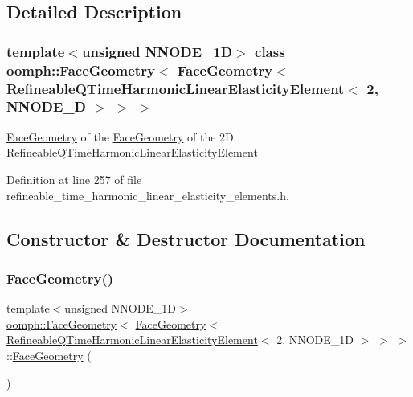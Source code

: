 \subsection{Detailed Description}
\subsubsection*{template$<$unsigned N\+N\+O\+D\+E\+\_\+1D$>$\newline
class oomph\+::\+Face\+Geometry$<$ Face\+Geometry$<$ Refineable\+Q\+Time\+Harmonic\+Linear\+Elasticity\+Element$<$ 2, N\+N\+O\+D\+E\+\_\+D $>$ $>$ $>$}

\hyperlink{classoomph_1_1FaceGeometry}{Face\+Geometry} of the \hyperlink{classoomph_1_1FaceGeometry}{Face\+Geometry} of the 2D \hyperlink{classoomph_1_1RefineableQTimeHarmonicLinearElasticityElement}{Refineable\+Q\+Time\+Harmonic\+Linear\+Elasticity\+Element} 

Definition at line 257 of file refineable\+\_\+time\+\_\+harmonic\+\_\+linear\+\_\+elasticity\+\_\+elements.\+h.



\subsection{Constructor \& Destructor Documentation}
\mbox{\label{classoomph_1_1FaceGeometry_3_01FaceGeometry_3_01RefineableQTimeHarmonicLinearElasticityElement_30dd001f9853903c36c2fd45bbf5d07b1_a7fe13602752eb37aacf55c21912186cc}} 
\subsubsection{\texorpdfstring{Face\+Geometry()}{FaceGeometry()}}
{\footnotesize\ttfamily template$<$unsigned N\+N\+O\+D\+E\+\_\+1D$>$ \\
\hyperlink{classoomph_1_1FaceGeometry}{oomph\+::\+Face\+Geometry}$<$ \hyperlink{classoomph_1_1FaceGeometry}{Face\+Geometry}$<$ \hyperlink{classoomph_1_1RefineableQTimeHarmonicLinearElasticityElement}{Refineable\+Q\+Time\+Harmonic\+Linear\+Elasticity\+Element}$<$ 2, N\+N\+O\+D\+E\+\_\+1D $>$ $>$ $>$\+::\hyperlink{classoomph_1_1FaceGeometry}{Face\+Geometry} (\begin{DoxyParamCaption}{ }\end{DoxyParamCaption})\hspace{0.3cm}{\ttfamily [inline]}}



